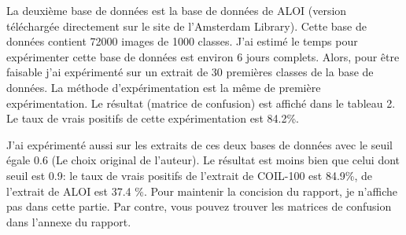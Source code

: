 \documentclass[french,12pt,a4paper,oneside,notitlepage]{report}
\begin{document}
La deuxième base de données est la base de données de ALOI (version téléchargée directement sur le site de l'Amsterdam Library). Cette base de données
contient 72000 images de 1000 classes. J'ai estimé le temps pour expérimenter cette base de données est environ 6 jours complets. Alors, pour être faisable
j'ai expérimenté sur un extrait de 30 premières classes de la base de données. La méthode d'expérimentation est la même de première expérimentation.
Le résultat (matrice de confusion) est affiché dans le tableau 2.  Le taux de vrais positifs de cette expérimentation est 84.2\%.

J'ai expérimenté aussi sur les extraits de ces deux bases de données avec le seuil égale 0.6 (Le choix original de l'auteur). Le résultat est moins bien que
celui dont seuil est 0.9: le taux de vrais positifs de l'extrait de COIL-100 est 84.9\%, de l'extrait de ALOI est 37.4 \%. Pour maintenir la concision du rapport, je n'affiche pas dans cette partie. 
Par contre, vous pouvez trouver les matrices de confusion dans l'annexe du rapport.
\end{document}
